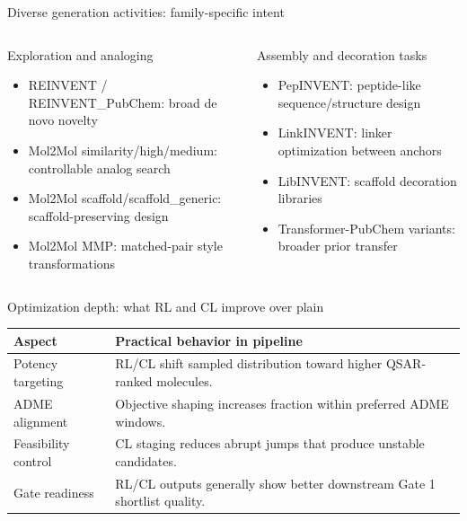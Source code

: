 \documentclass[aspectratio=169,10pt]{beamer}
\begin{document}
\begin{frame}{Diverse generation activities: family-specific intent}
  \small
  \begin{columns}[T]
      \begin{block}{Exploration and analoging}
        \begin{itemize}
          \item REINVENT / REINVENT\_PubChem: broad de novo novelty
          \item Mol2Mol similarity/high/medium: controllable analog search
          \item Mol2Mol scaffold/scaffold\_generic: scaffold-preserving design
          \item Mol2Mol MMP: matched-pair style transformations
        \end{itemize}
      \end{block}
      \begin{block}{Assembly and decoration tasks}
        \begin{itemize}
          \item PepINVENT: peptide-like sequence/structure design
          \item LinkINVENT: linker optimization between anchors
          \item LibINVENT: scaffold decoration libraries
          \item Transformer-PubChem variants: broader prior transfer
        \end{itemize}
      \end{block}
  \end{columns}
\end{frame}

\begin{frame}{Optimization depth: what RL and CL improve over plain}
  \small
  \begin{tabularx}{\textwidth}{lX}
    \toprule
    \textbf{Aspect} & \textbf{Practical behavior in pipeline} \\
    \midrule
    Potency targeting & RL/CL shift sampled distribution toward higher QSAR-ranked molecules. \\
    ADME alignment & Objective shaping increases fraction within preferred ADME windows. \\
    Feasibility control & CL staging reduces abrupt jumps that produce unstable candidates. \\
    Gate readiness & RL/CL outputs generally show better downstream Gate 1 shortlist quality. \\
    \bottomrule
  \end{tabularx}
\end{frame}
\end{document}
